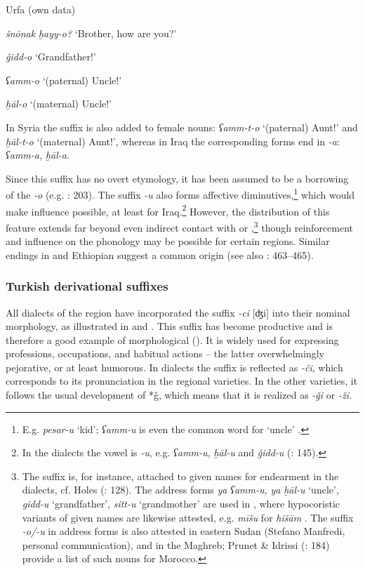 \documentclass[output=paper]{langsci/langscibook}
\begin{document}
\ea
Urfa (own data)

\textit{šnōnak} \textit{ḫayy-o?} ‘Brother, how are you?’

\textit{ǧidd-o} ‘Grandfather!’

\textit{ʕamm-o} ‘(paternal) Uncle!’

\textit{ḫāl-o} ‘(maternal) Uncle!’
\z

In Syria the suffix is also added to female nouns: \textit{ʕamm-t-o} ‘(paternal) Aunt!’ and \textit{ḫāl-t-o} ‘(maternal) Aunt!’, whereas in Iraq the corresponding forms end in \textit{{}-a}: \textit{ʕamm-a,} \textit{ḫāl-a}.

Since this suffix has no overt  etymology, it has been assumed to be a borrowing of the   \textit{-o} (e.g. \citealt{Grigore2007book}: 203). The  suffix \textit{-u} also forms affective diminutives,\footnote{E.g. \textit{pesar-u} ‘kid’; \textit{ʕamm-u} is even the common word for ‘uncle’ \citep[1011]{Perry2007}.} which would make  influence possible, at least for Iraq.\footnote{In the  dialects the vowel is \textit{-u}, e.g. \textit{ʕamm-u,} \textit{ḫāl-u} and \textit{ǧidd-u} (\citealt{Abu-Haidar1999}: 145).} However, the distribution of this feature extends far beyond even indirect contact with  or ,\footnote{The suffix is, for instance, attached to given names for endearment in the  dialects, cf. Holes (\citeyear{Holes2016}: 128). The address forms \textit{ya} \textit{ʕamm-u,} \textit{ya} \textit{ḫāl-u} ‘uncle’, \textit{gidd-u} ‘grandfather’, \textit{sitt-u} ‘grandmother’ are used in , where hypocoristic variants of given names are likewise attested, e.g. \textit{mīšu} for \textit{hišām} \citep[109]{Woidich2006}. The suffix \textit{-o/-u} in address forms is also attested in eastern Sudan (Stefano Manfredi, personal communication), and in the Maghreb; Prunet \& Idrissi (\citeyear{PrunetIdrissi2014}: 184) provide a list of such nouns for Morocco.} though reinforcement and influence on the phonology may be possible for certain regions. Similar endings in  \citep[88--89]{Fassberg2010} and Ethiopian \citep[122]{Brockelmann1928} suggest a common  origin (see also \citealt{Pat-El2017}: 463--465). 

\subsubsection{Turkish derivational suffixes}
All dialects of the region have incorporated the  suffix \textit{-ci} [ʤi] into their nominal morphology, as illustrated in  and . This suffix has become productive and is therefore a good example of morphological  (\citealt{GardaniArkadievAmiridze2015}). It is widely used for expressing professions, occupations, and habitual actions – the latter overwhelmingly pejorative, or at least humorous. In  dialects the suffix is reflected as \textit{-či}, which corresponds to its pronunciation in the regional  varieties. In the other varieties, it follows the usual development of *ǧ, which means that it is realized as \textit{-ǧi} or \textit{-ži.} 
\end{document}
